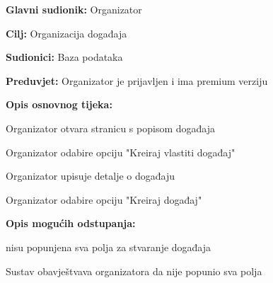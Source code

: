 					\noindent {}
					\begin{packed_item}
	
						\item \textbf{Glavni sudionik: }Organizator
						\item  \textbf{Cilj:} Organizacija događaja
						\item  \textbf{Sudionici:} Baza podataka
						\item  \textbf{Preduvjet:} Organizator je prijavljen i ima premium verziju
						\item  \textbf{Opis osnovnog tijeka:}
						
						\item[] \begin{packed_enum}
	
							\item Organizator otvara stranicu s popisom događaja
							\item Organizator odabire opciju "Kreiraj vlastiti događaj"
							\item Organizator upisuje detalje o događaju
							\item Organizator odabire opciju "Kreiraj događaj"

						\end{packed_enum}
						
						\item  \textbf{Opis mogućih odstupanja:}
						
						\item[] \begin{packed_item}
	
							\item[4.a] nisu popunjena sva polja za stvaranje događaja
							\item[] \begin{packed_enum}
								
								\item Sustav obavještvava organizatora da nije popunio sva polja
								
							\end{packed_enum}
							
						\end{packed_item}
					\end{packed_item}

